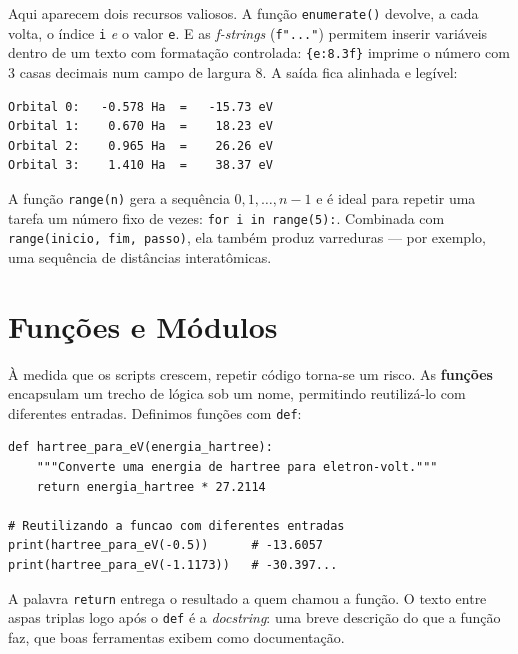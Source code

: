 \documentclass[11pt,a4paper,openany]{book}
\newcommand{\code}[1]{\texttt{#1}}
\begin{document}
\noindent
Aqui aparecem dois recursos valiosos. A função \code{enumerate()} devolve, a cada
volta, o índice \code{i} \emph{e} o valor \code{e}. E as \emph{f-strings}
(\code{f"..."}) permitem inserir variáveis dentro de um texto com formatação
controlada: \code{\{e:8.3f\}} imprime o número com 3 casas decimais num campo de
largura 8. A saída fica alinhada e legível:

\begin{lstlisting}[style=console]
Orbital 0:   -0.578 Ha  =   -15.73 eV
Orbital 1:    0.670 Ha  =    18.23 eV
Orbital 2:    0.965 Ha  =    26.26 eV
Orbital 3:    1.410 Ha  =    38.37 eV
\end{lstlisting}

\begin{caixadica}
A função \code{range(n)} gera a sequência $0, 1, \dots, n-1$ e é ideal para repetir
uma tarefa um número fixo de vezes: \code{for i in range(5):}. Combinada com
\code{range(inicio, fim, passo)}, ela também produz varreduras --- por exemplo, uma
sequência de distâncias interatômicas.
\end{caixadica}

\section{Funções e Módulos}
\label{sec:funcoes}

À medida que os scripts crescem, repetir código torna-se um risco. As
\textbf{funções} encapsulam um trecho de lógica sob um nome, permitindo reutilizá-lo
com diferentes entradas. Definimos funções com \code{def}:

\begin{lstlisting}[style=python,caption={Uma função para converter energias.},label={lst:funcao}]
def hartree_para_eV(energia_hartree):
    """Converte uma energia de hartree para eletron-volt."""
    return energia_hartree * 27.2114

# Reutilizando a funcao com diferentes entradas
print(hartree_para_eV(-0.5))      # -13.6057
print(hartree_para_eV(-1.1173))   # -30.397...
\end{lstlisting}

\noindent
A palavra \code{return} entrega o resultado a quem chamou a função. O texto entre
aspas triplas logo após o \code{def} é a \emph{docstring}: uma breve descrição do
que a função faz, que boas ferramentas exibem como documentação.
\end{document}
